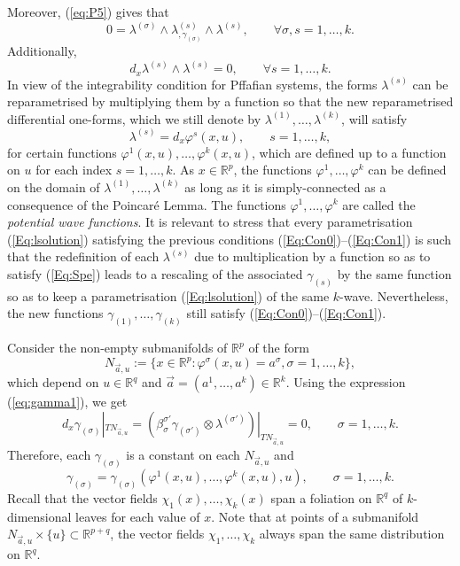 \documentclass{birkjour}
\theoremstyle{definition}
\theoremstyle{remark}
\numberwithin{equation}{section}
\numberwithin{equation}{section}
\numberwithin{thm}{section}
\numberwithin{equation}{section}
\numberwithin{thm}{section}
\begin{document}
Moreover,  (\ref{eq:P5}) gives that
\begin{equation}\label{Eq:Con2}
	0=\lambda^{(\sigma)}\wedge \lambda^{(s)}_{,\gamma_{(\sigma)}}\wedge \lambda^{(s)},\qquad \forall \sigma,s=1,\ldots,k.
\end{equation}
Additionally,
\begin{equation}\label{Eq:Con1}
	d_x\lambda^{(s)}\wedge\lambda^{(s)}=0,\qquad\forall s=1,\ldots,k.
\end{equation}
In view of the integrability condition for Pffafian systems, the forms $\lambda^{(s)}$ can be reparametrised by multiplying them by a function so  that  the new reparametrised differential one-forms, which we still denote by $\lambda^{(1)},\ldots,\lambda^{(k)}$,  will satisfy
\begin{equation}\label{Eq:Spe}
	\lambda^{(s)}=d_x\varphi^s(x,u),\qquad s=1,\ldots,k,
\end{equation}
for certain functions $\varphi^1(x,u),\ldots,\varphi^k(x,u)$, which are defined up to a function on $u$ for each index $s=1,\ldots,k$. As $x\in \mathbb{R}^p$, the functions $\varphi^1,\ldots,\varphi^k$ can be defined on the domain of $\lambda^{(1)},\ldots,\lambda^{(k)}$ as long as it is simply-connected as a consequence of the Poincar\'e Lemma. The functions $\varphi^1,\ldots,\varphi^k$ are called the {\it potential wave functions}. 
It is relevant to stress that every parametrisation (\ref{Eq:lsolution}) satisfying the previous conditions (\ref{Eq:Con0})--(\ref{Eq:Con1}) is such that the redefinition of each $\lambda^{(s)}$ due to  multiplication by a function so as to satisfy (\ref{Eq:Spe}) leads to a rescaling of the associated $\gamma_{(s)}$ by the same function so as to keep a parametrisation (\ref{Eq:lsolution}) of the same $k$-wave. Nevertheless, the new functions $\gamma_{(1)},\ldots,\gamma_{(k)}$ still satisfy (\ref{Eq:Con0})--(\ref{Eq:Con1}).

Consider the non-empty submanifolds of $\mathbb{R}^p$ of the form
$$
N_{\vec{a},u}:=\{x\in \mathbb{R}^{p}:\varphi^\sigma(x,u)=a^\sigma,\sigma=1,\ldots,k\},
$$
which depend on $u\in \mathbb{R}^q$ and $\vec{a}=(a^1,\ldots,a^k)\in \mathbb{R}^k$.
Using the expression (\ref{eq:gamma1}), we get
$$
d_x\gamma_{(\sigma)}|_{TN_{\vec{a},u}}=(\beta^{\sigma'}_{\sigma}\gamma_{(\sigma')}\otimes \lambda^{(\sigma')})|_{TN_{\vec{a},u}}=0,\qquad \sigma=1,\ldots,k.
$$
Therefore, each $\gamma_{(\sigma)}$ is a constant on each $N_{\vec{a},u}$ and 
$$
\gamma_{(\sigma)}=\gamma_{(\sigma)}(\varphi^1(x,u),\ldots,\varphi^{k}(x,u),u),\qquad \sigma=1,\ldots,k.
$$
Recall that the vector fields $\chi_1(x),\ldots,\chi_k(x)$ span a foliation on $\mathbb{R}^q$ of $k$-dimensional leaves for each value of $x$. Note that at points of a submanifold $N_{\vec{a},u}\times\{u\}\subset \mathbb{R}^{p+q}$, the vector fields $\chi_1,\ldots,\chi_k$ always span the same distribution on $\mathbb{R}^q$. 
\end{document}
